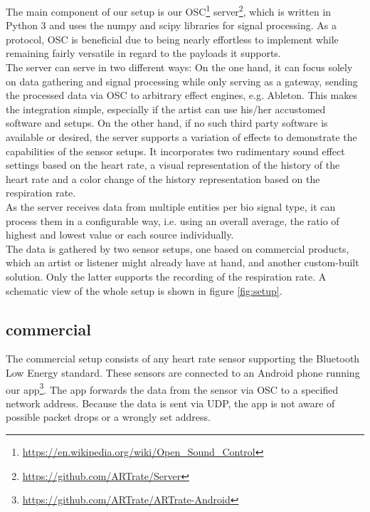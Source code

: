 \documentclass{sigchi-ext}
\begin{document}
The main component of our setup is our OSC\footnote{\url{https://en.wikipedia.org/wiki/Open_Sound_Control}}
server\footnote{\url{https://github.com/ARTrate/Server}}, which is written in Python 3 and uses the numpy and
scipy libraries for signal processing. As a protocol, OSC is beneficial due to being nearly effortless
to implement while remaining fairly versatile in regard to the payloads it supports. \\
The server can serve in two different ways: On the one hand, it can focus solely on data gathering and signal 
processing while only serving as a gateway, sending the processed data via OSC to arbitrary effect
engines, e.g. Ableton. This makes the integration simple, especially if the artist can use his/her accustomed
software and setups. On the other hand, if no such third party software is available or desired, the server supports a
variation of effects to demonstrate the capabilities of the sensor setups. It incorporates two rudimentary
sound effect settings based on the heart rate, a visual representation of the history of the heart rate
and a color change of the history representation based on the respiration rate.\\
As the server receives data from multiple entities per bio signal type, it can process them in a 
configurable way, i.e. using an overall average, the ratio of highest and lowest value or each source
individually. \\
The data is gathered by two sensor setups, one based on commercial products, which an artist or
listener might already have at hand, and another custom-built solution. Only the latter supports
the recording of the respiration rate. A schematic view of the whole setup is shown in figure \ref{fig:setup}.

\subsection{commercial}

The commercial setup consists of any heart rate sensor supporting the Bluetooth Low Energy
standard. These sensors are connected to an Android phone running our app\footnote{\url{https://github.com/ARTrate/ARTrate-Android}}.
The app forwards the data from the sensor via OSC to a specified network address.
Because the data is sent via UDP, the app is not aware of possible packet drops or a wrongly set address.
\end{document}
